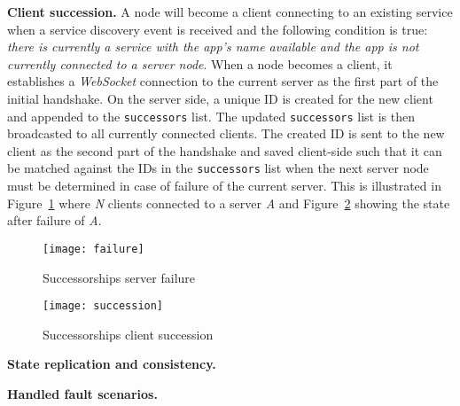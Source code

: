 \noindent\textbf{Client succession.}
A \APIshort node will become a client connecting to an existing service when a service discovery event is received and the following condition is true: \textit{there is currently a \APIshort service with the app's name available and the app is not currently connected to a server node}. 
When a node becomes a client, it establishes a \textit{WebSocket} connection to the current server as the first part of the initial handshake. 
On the server side, a unique ID is created for the new client and appended to the \texttt{successors} list. The updated \texttt{successors} list is then broadcasted to all currently connected clients. 
The created ID is sent to the new client as the second part of the handshake and saved client-side such that it can be matched against the IDs in the \texttt{successors} list when the next server node must be determined in case of failure of the current server. 
This is illustrated in Figure~\ref{fig:failure} where \textit{N} clients connected to a server \textit{A} and Figure~\ref{fig:succession} showing the state after failure of \textit{A}.

\begin{figure}[h]
    \centering
    \texttt{[image: failure]}
    \caption{Successorships server failure}
    \label{fig:failure}
\end{figure}

\begin{figure}[h]
    \centering
    \texttt{[image: succession]}
    \caption{Successorships client succession}
    \label{fig:succession}
\end{figure}

\noindent\textbf{State replication and consistency.}

\noindent\textbf{Handled fault scenarios.}

